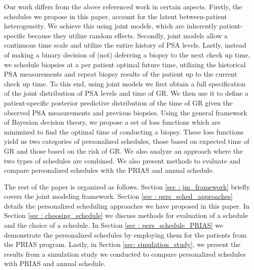 Our work differs from the above referenced work in certain aspects. Firstly, the schedules we propose in this paper, account for the latent between-patient heterogeneity. We achieve this using joint models, which are inherently patient-specific because they utilize random effects. Secondly, joint models allow a continuous time scale and utilize the entire history of PSA levels. Lastly, instead of making a binary decision of (not) deferring a biopsy to the next check up time, we schedule biopsies at a per patient optimal future time, utilizing the historical PSA measurements and repeat biopsy results of the patient up to the current check up time. To this end, using joint models we first obtain a full specification of the joint distribution of PSA levels and time of GR. We then use it to define a patient-specific posterior predictive distribution of the time of GR given the observed PSA measurements and previous biopsies. Using the general framework of Bayesian decision theory, we propose a set of loss functions which are minimized to find the optimal time of conducting a biopsy. These loss functions yield us two categories of personalized schedules, those based on expected time of GR and those based on the risk of GR. We also analyze an approach where the two types of schedules are combined. We also present methods to evaluate and compare personalized schedules with the PRIAS and annual schedule.

The rest of the paper is organized as follows. Section \ref{sec : jm_framework} briefly covers the joint modeling framework. Section \ref{sec : pers_sched_approaches} details the personalized scheduling approaches we have proposed in this paper. In Section \ref{sec : choosing_schedule} we discuss methods for evaluation of a schedule and the choice of a schedule. In Section \ref{sec : pers_schedule_PRIAS} we demonstrate the personalized schedules by employing them for the patients from the PRIAS program. Lastly, in Section \ref{sec: simulation_study}, we present the results from a simulation study we conducted to compare personalized schedules with PRIAS and annual schedule.
